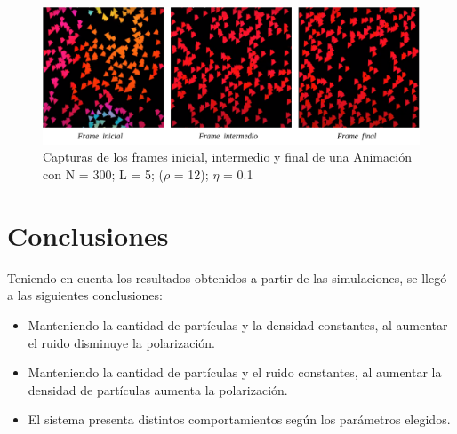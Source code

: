 \documentclass[12pt, a4paper]{report}
\begin{document}
\pagebreak
\begin{figure}[h]
\includegraphics[scale=0.4]{d_big_n_small.png}
\centering 
\caption{Capturas de los frames inicial, intermedio y final de una Animación con N = 300; L = 5; ($\rho$ = 12); $\eta$ = 0.1}
\label{fig:d_big_n_small}
\end{figure}

\section{Conclusiones}
Teniendo en cuenta los resultados obtenidos a partir de las simulaciones, se llegó a las siguientes conclusiones:
\begin{itemize}
    \item Manteniendo la cantidad de partículas y la densidad constantes, al aumentar el ruido disminuye la polarización.
    \item Manteniendo la cantidad de partículas y el ruido constantes, al aumentar la densidad de partículas aumenta la polarización.
    \item El sistema presenta distintos comportamientos según los parámetros elegidos.
\end{itemize}



\end{document}
